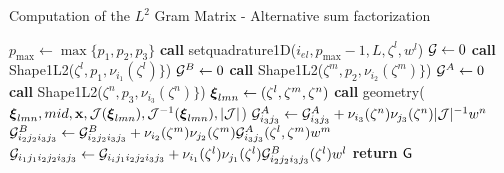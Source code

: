 \begin{algorithm}[ht!]
\caption{Computation of the $L^2$ Gram Matrix - Alternative sum factorization}\label{algo:l2tensor_alt}
\begin{algorithmic}
\State $p_{\max}\gets\max\{p_1,p_2,p_3\}$
\State\textbf{call }setquadrature1D($i_{el},p_{\max}-1,L,\zeta^l,w^l$)
\State $\mathcal{G}\gets 0$
    \State\textbf{call } Shape1L2($\zeta^l,p_1,\nu_{i_1}(\zeta^l)\}$) 
    \State $\mathcal{G}^B\gets 0$
        \State\textbf{call } Shape1L2($\zeta^m,p_2,\nu_{i_2}(\zeta^m)\}$) 
        \State $\mathcal{G}^A\gets 0$
            \State\textbf{call } Shape1L2($\zeta^n,p_3,\nu_{i_3}(\zeta^n)\}$) 
                    \State $\boldsymbol{\xi}_{lmn}\gets (\zeta^l,\zeta^m,\zeta^n)$
                    \State\textbf{call } geometry( $\boldsymbol{\xi}_{lmn},mid,\mathbf{x},\mathcal{J}(\boldsymbol{\xi}_{lmn}),\mathcal{J}^{-1}(\boldsymbol{\xi}_{lmn}),|\mathcal{J}|$)
                    \State$\mathcal{G}_{i_3j_3}^A\gets \mathcal{G}_{i_3j_3}^A+ \nu_{i_3}(\zeta^n)\nu_{j_3}(\zeta^n)|\mathcal{J}|^{-1}w^n$ 
                \EndFor
            \EndFor
        \EndFor
                        \State$\mathcal{G}_{i_2j_2i_3j_3}^B\gets \mathcal{G}_{i_2j_2i_3j_3}^B+ \nu_{i_2}(\zeta^m)\nu_{j_2}(\zeta^m)\mathcal{G}_{i_3j_3}^A(\zeta^l,\zeta^m)w^m$ 
                    \EndFor
                \EndFor
            \EndFor
        \EndFor
    \EndFor
                            \State $\mathcal{G}_{i_1j_1i_2j_2i_3j_3}\gets \mathcal{G}_{i_ij_1i_2j_2i_3j_3}+ \nu_{i_1}(\zeta^l)\nu_{j_1}(\zeta^l)\mathcal{G}_{i_2j_2i_3j_3}^B(\zeta^l)w^l$ 
                        \EndFor
                    \EndFor
                \EndFor
            \EndFor
        \EndFor
    \EndFor
\EndFor
\State \textbf{return} $\mathsf{G}$
\EndProcedure
\end{algorithmic}
\end{algorithm}

